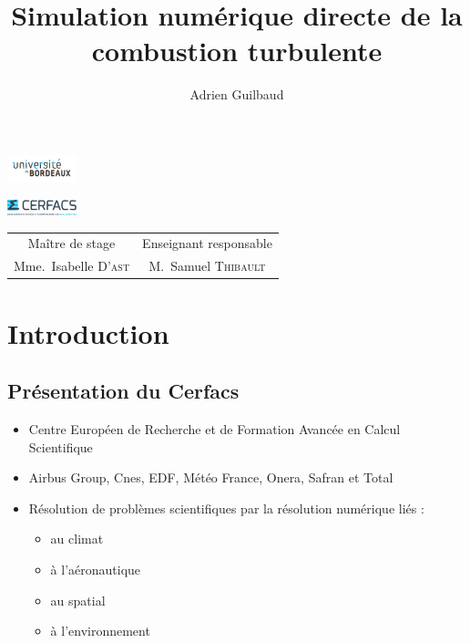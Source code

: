 \documentclass{beamer}
\author{Adrien Guilbaud}
\title{Simulation numérique directe de la combustion turbulente}
\begin{document}
 

\begin{frame}
    \parbox[c]{-50cm}{\centering%
      \includegraphics[width=2cm]{figures/logo_fac.jpg}%
    }%
    \parbox[c]{19.5cm}{\centering%
      \includegraphics[width=2cm]{figures/logo_cerfacs.eps}
    }%
\maketitle

\centering
\footnotesize
\begin{tabular}{cc}
  Maître de stage & Enseignant responsable \\
  Mme.~Isabelle \textsc{D'ast} &   M.~Samuel \textsc{Thibault} \\
  \end{tabular}
\end{frame}

%
%

\section{Introduction}
\subsection{Présentation du Cerfacs}
\begin{frame}
  \begin{itemize}
  \item Centre Européen de Recherche et de Formation Avancée en Calcul Scientifique
  \item Airbus Group, Cnes, EDF, Météo France, Onera, Safran et Total
  
    \item Résolution de problèmes scientifiques par la résolution numérique liés :
	\begin{itemize}
  \item au climat
  \item à l'aéronautique
  \item au spatial
  \item à l'environnement
  \end{itemize}
  \end{itemize}


  
\end{frame}
\end{document}
